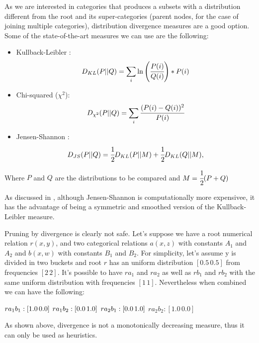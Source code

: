 As we are interested in categories that produces a subsets with a distribution different from the root and its super-categories (parent nodes, for the case of joining multiple categories), distribution divergence measures are a good option. Some of the state-of-the-art measures we can use are the following:

\begin{itemize}
 \item Kullback-Leibler \cite{Kullback51klDivergence}: 
    \begin{equation}
      D_{KL}(P||Q)=\sum_{\substack{i}}\ln\left(\cfrac{P(i)}{Q(i)}\right)*P(i)
    \end{equation}
 \item Chi-squared ($\chi^2$):
    \begin{equation}
      D_{\chi^2}(P||Q)=\sum_{\substack{i}}\cfrac{(P(i)-Q(i))^2}{P(i)}
    \end{equation}
 \item Jensen-Shannon \cite{17795}:
    \begin{equation}
      D_{JS}(P||Q)=\cfrac{1}{2}D_{KL}(P||M)+\cfrac{1}{2}D_{KL}(Q||M), 
    \end{equation}
\end{itemize}

Where $P$ and $Q$ are the distributions to be compared and $M=\cfrac{1}{2}(P+Q)$

As discussed in \cite{17795}, although Jensen-Shannon is computationally more expensivee, it has the advantage of being a symmetric and smoothed version of the Kullback-Leibler measure.

Pruning by divergence is clearly not safe. Let's suppose we have a root numerical relation $r(x,y)$, and two categorical relations $a(x,z)$ with constants $A_1$ and $A_2$ and $b(x,w)$ with constants $B_1$ and $B_2$. For simplicity, let's assume y is divided in two buckets and root $r$ has an uniform distribution $[0.5 \, 0.5]$ from frequencies $[2 \, 2]$. It's possible to have $r a_1$ and $r a_2$ as well as $r b_1$ and $r b_2$ with the same uniform distribution with frequencies $[1 \, 1]$. Nevertheless when combined we can have the following:

$r a_1 b_1 : [1.0 \, 0.0] \\$
$r a_1 b_2 : [0.0 \, 1.0] \\$
$r a_2 b_1 : [0.0 \, 1.0] \\$
$r a_2 b_2 : [1.0 \, 0.0]$

As shown above, divergence is not a monotonically decreasing measure, thus it can only be used as heuristics.

